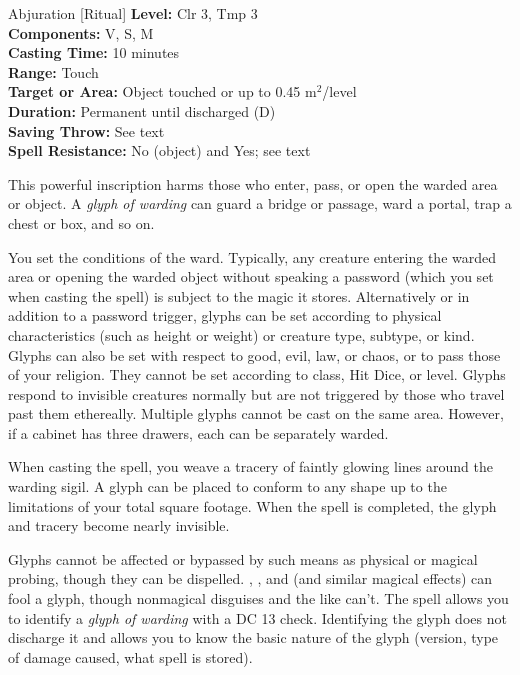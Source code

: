 {Abjuration [Ritual]}
{
	\textbf{Level:}
	Clr 3, Tmp 3\\
	\textbf{Components:}
	V, S, M\\
	\textbf{Casting Time:}
	10 minutes\\
	\textbf{Range:}
	Touch\\
	\textbf{Target or Area:}
	Object touched or up to 0.45 m$^2$/level\\
	\textbf{Duration:}
	Permanent until discharged (D)\\
	\textbf{Saving Throw:}
	See text\\
	\textbf{Spell Resistance:}
	No (object) and Yes; see text\\
}
{
	This powerful inscription harms those who enter, pass, or open the warded area or object. A \emph{glyph of warding} can guard a bridge or passage, ward a portal, trap a chest or box, and so on.

	You set the conditions of the ward. Typically, any creature entering the warded area or opening the warded object without speaking a password (which you set when casting the spell) is subject to the magic it stores. Alternatively or in addition to a password trigger, glyphs can be set according to physical characteristics (such as height or weight) or creature type, subtype, or kind. Glyphs can also be set with respect to good, evil, law, or chaos, or to pass those of your religion. They cannot be set according to class, Hit Dice, or level. Glyphs respond to invisible creatures normally but are not triggered by those who travel past them ethereally. Multiple glyphs cannot be cast on the same area. However, if a cabinet has three drawers, each can be separately warded.

	When casting the spell, you weave a tracery of faintly glowing lines around the warding sigil. A glyph can be placed to conform to any shape up to the limitations of your total square footage. When the spell is completed, the glyph and tracery become nearly invisible.

	Glyphs cannot be affected or bypassed by such means as physical or magical probing, though they can be dispelled. , , and  (and similar magical effects) can fool a glyph, though nonmagical disguises and the like can't. The  spell allows you to identify a \emph{glyph of warding} with a DC 13  check. Identifying the glyph does not discharge it and allows you to know the basic nature of the glyph (version, type of damage caused, what spell is stored).

}
